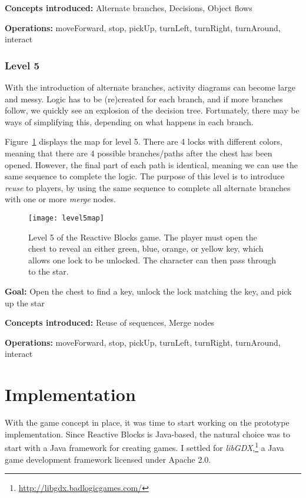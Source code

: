 \noindent
\textbf{Concepts introduced:} Alternate branches, Decisions, Object flows

\noindent
\textbf{Operations:} moveForward, stop, pickUp, turnLeft, turnRight, turnAround, interact

\subsubsection{Level 5}
With the introduction of alternate branches, activity diagrams can become large and messy. Logic has to be (re)created for each branch, and if more branches follow, we quickly see an explosion of the decision tree. Fortunately, there may be ways of simplifying this, depending on what happens in each branch.

\noindent
Figure~\ref{fig:level5map} displays the map for level 5. There are 4 locks with different colors, meaning that there are 4 possible branches/paths after the chest has been opened. However, the final part of each path is identical, meaning we can use the same sequence to complete the logic. The purpose of this level is to introduce \emph{reuse} to players, by using the same sequence to complete all alternate branches with one or more \emph{merge} nodes.

\begin{figure}[htp]
	\centering
	\texttt{[image: level5map]}
	\caption[Level 5 of the Reactive Blocks game]{Level 5 of the Reactive Blocks game. The player must open the chest to reveal an either green, blue, orange, or yellow key, which allows one lock to be unlocked. The character can then pass through to the star.}
	\label{fig:level5map}
\end{figure}

\noindent
\textbf{Goal:} Open the chest to find a key, unlock the lock matching the key, and pick up the star

\noindent
\textbf{Concepts introduced:} Reuse of sequences, Merge nodes

\noindent
\textbf{Operations:} moveForward, stop, pickUp, turnLeft, turnRight, turnAround, interact

\section{Implementation}
\label{sec:game_implementation}
With the game concept in place, it was time to start working on the prototype implementation. Since Reactive Blocks is Java-based, the natural choice was to start with a Java framework for creating games. I settled for \emph{libGDX},\footnote{\url{http://libgdx.badlogicgames.com/}} a Java game development framework licensed under Apache 2.0.

